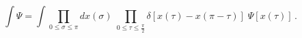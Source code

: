 \begin{equation}
\int \Psi = \int \prod_{0 \leq \sigma \leq \pi} dx (\sigma) \;
\prod_{0 \leq
\tau \leq \frac{\pi}{2} }
\delta[x(\tau)-x(\pi-\tau)] \;\Psi[x (\tau)]\,.
\label{eq:integral-p}
\end{equation}


